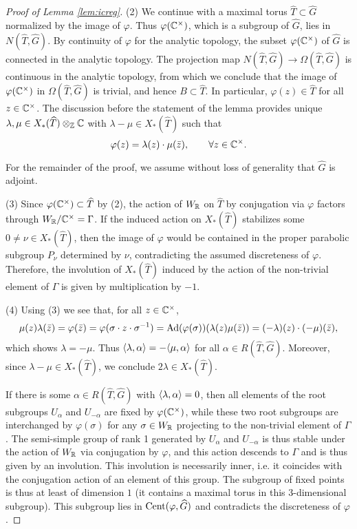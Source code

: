 \documentclass{article}
\theoremstyle{definition}
\numberwithin{equation}{section}
\renewcommand{\-}{\hyp{}}
\begin{document}
\begin{proof}[Proof of Lemma \ref{lem:icreg}]
(2) We continue with a maximal torus $\hat T \subset \hat G$ normalized by the image of $\varphi$. Thus $\varphi(\mathbb{C}^\times)$, which is a subgroup of $\hat G$, lies in $N(\hat T,\hat G)$. By continuity of $\varphi$ for the analytic topology, the subset $\varphi(\mathbb{C}^\times)$ of $\hat G$ is connected in the analytic topology. The projection map $N(\hat T,\hat G) \to \Omega(\hat T,\hat G)$ is continuous in the analytic topology, from which we conclude that the image of $\varphi(\mathbb{C}^\times)$ in $\Omega(\hat T,\hat G)$ is trivial, and hence $B \subset \hat T$. In particular, $\varphi(z) \in \hat T$ for all $z \in \mathbb{C}^\times$. The discussion before the statement of the lemma provides unique $\lambda,\mu \in X_*(\widehat T)\otimes_{\mathbb{Z}}\mathbb{C}$ with $\lambda-\mu \in X_*(\hat T)$ such that
\[ \varphi(z) = \lambda(z) \cdot \mu(\bar z),\qquad \forall z \in \mathbb{C}^\times. \]

For the remainder of the proof, we assume without loss of generality that $\hat G$ is adjoint.

(3) Since $\varphi(\mathbb{C}^\times) \subset \widehat T$ by (2), the action of $W_{\mathbb{R}}$ on $\hat T$ by conjugation via $\varphi$ factors through $W_{\mathbb{R}}/\mathbb{C}^\times=\Gamma$. If the induced action on $X_*(\hat T)$ stabilizes some $0 \neq \nu \in X_*(\hat T)$, then the image of $\varphi$ would be contained in the proper parabolic subgroup $P_\nu$ determined by $\nu$, contradicting the assumed discreteness of $\varphi$. Therefore, the involution of $X_*(\hat T)$ induced by the action of the non-trivial element of $\Gamma$ is given by multiplication by $-1$. 

(4) Using (3) we see that, for all $z \in \mathbb{C}^\times$,
\[ \mu(z)\lambda(\bar z)=\varphi(\bar z)=\varphi(\sigma \cdot z \cdot \sigma^{-1})=\textrm{Ad}(\varphi(\sigma))(\lambda(z)\mu(\bar z))=(-\lambda)(z) \cdot (-\mu)(\bar z), \] which shows $\lambda=-\mu$. Thus $\langle\lambda,\alpha\rangle=-\langle\mu,\alpha\rangle$ for all $\alpha \in R(\hat T,\hat G)$. Moreover, since $\lambda-\mu \in X_*(\hat T)$, we conclude $2\lambda \in X_*(\hat T)$.

If there is some $\alpha \in R(\hat T,\hat G)$ with $\langle\lambda,\alpha\rangle=0$, then all elements of the root subgroups $U_\alpha$ and $U_{-\alpha}$ are fixed by $\varphi(\mathbb{C}^\times)$, while these two root subgroups are interchanged by $\varphi(\sigma)$ for any $\sigma \in W_{\mathbb{R}}$ projecting to the non-trivial element of $\Gamma$. The semi-simple group of rank 1 generated by $U_\alpha$ and $U_{-\alpha}$ is thus stable under the action of $W_{\mathbb{R}}$ via conjugation by $\varphi$, and this action descends to $\Gamma$ and is thus given by an involution. This involution is necessarily inner, i.e. it coincides with the conjugation action of an element of this group. The subgroup of fixed points is thus at least of dimension $1$ (it contains a maximal torus in this 3-dimensional subgroup). This subgroup lies in $\textrm{Cent}(\varphi,\widehat G)$ and contradicts the discreteness of $\varphi$.


\end{proof}
\end{document}
